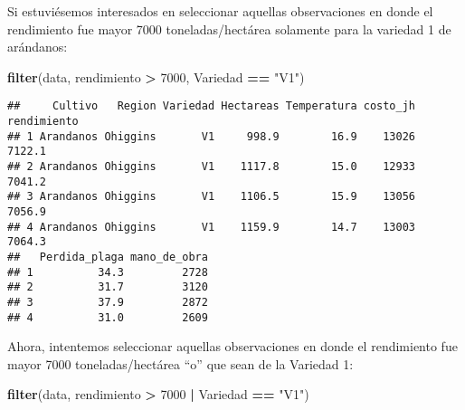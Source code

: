 \documentclass[]{book}
\newenvironment{Shaded}{\begin{snugshade}}{\end{snugshade}}
\newcommand{\DecValTok}[1]{\textcolor[rgb]{0.00,0.00,0.81}{#1}}
\newcommand{\KeywordTok}[1]{\textcolor[rgb]{0.13,0.29,0.53}{\textbf{#1}}}
\newcommand{\NormalTok}[1]{#1}
\newcommand{\OperatorTok}[1]{\textcolor[rgb]{0.81,0.36,0.00}{\textbf{#1}}}
\newcommand{\StringTok}[1]{\textcolor[rgb]{0.31,0.60,0.02}{#1}}
\begin{document}
Si estuviésemos interesados en seleccionar aquellas observaciones en donde el rendimiento fue mayor 7000
toneladas/hectárea solamente para la variedad 1 de arándanos:

\begin{Shaded}
\begin{Highlighting}[]
\KeywordTok{filter}\NormalTok{(data, rendimiento }\OperatorTok{>}\StringTok{ }\DecValTok{7000}\NormalTok{, Variedad }\OperatorTok{==}\StringTok{ "V1"}\NormalTok{)}
\end{Highlighting}
\end{Shaded}

\begin{verbatim}
##     Cultivo   Region Variedad Hectareas Temperatura costo_jh rendimiento
## 1 Arandanos Ohiggins       V1     998.9        16.9    13026      7122.1
## 2 Arandanos Ohiggins       V1    1117.8        15.0    12933      7041.2
## 3 Arandanos Ohiggins       V1    1106.5        15.9    13056      7056.9
## 4 Arandanos Ohiggins       V1    1159.9        14.7    13003      7064.3
##   Perdida_plaga mano_de_obra
## 1          34.3         2728
## 2          31.7         3120
## 3          37.9         2872
## 4          31.0         2609
\end{verbatim}

Ahora, intentemos seleccionar aquellas observaciones en donde el rendimiento fue mayor 7000 toneladas/hectárea ``o'' que sean de la Variedad 1:

\begin{Shaded}
\begin{Highlighting}[]
\KeywordTok{filter}\NormalTok{(data, rendimiento }\OperatorTok{>}\StringTok{ }\DecValTok{7000} \OperatorTok{|}\StringTok{ }\NormalTok{Variedad }\OperatorTok{==}\StringTok{ "V1"}\NormalTok{)}
\end{Highlighting}
\end{Shaded}
\end{document}

